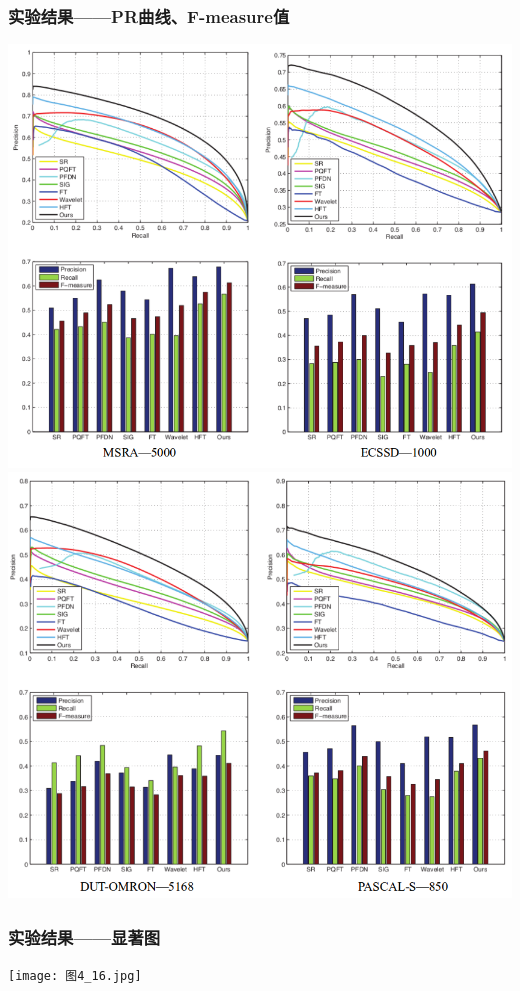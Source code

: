 \documentclass[notheorems,mathserif,table,compress]{beamer}  %
\begin{document}
\begin{frame}
  \frametitle{实验结果——PR曲线、F-measure值}
\begin{center}
\includegraphics[width=0.48\linewidth]{pr11.png}%
\includegraphics[width=0.48\linewidth]{pr12.png}%
\end{center}
\end{frame}



\begin{frame}
  \frametitle{实验结果——显著图}
\begin{center}
\texttt{[image: 图4\_16.jpg]}%
\end{center}
\end{frame}
\end{document}
